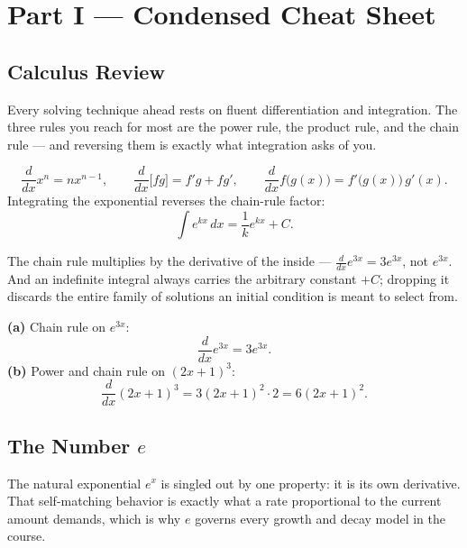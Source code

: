 \documentclass[11pt]{article}
\begin{document}
\section*{Part I --- Condensed Cheat Sheet}
\setcounter{section}{1}   %

\subsection{Calculus Review}

Every solving technique ahead rests on fluent differentiation and integration.
The three rules you reach for most are the power rule, the product rule, and the
chain rule --- and reversing them is exactly what integration asks of you.

\begin{formulabox}
\[
    \frac{d}{dx}x^{n} = nx^{n-1}, \qquad
    \frac{d}{dx}\big[f g\big] = f'g + fg', \qquad
    \frac{d}{dx}f\big(g(x)\big) = f'\big(g(x)\big)\,g'(x).
\]
Integrating the exponential reverses the chain-rule factor:
\[
    \int e^{kx}\,dx = \frac{1}{k}e^{kx} + C.
\]
\end{formulabox}

\begin{warningbox}
The chain rule multiplies by the derivative of the inside --- $\frac{d}{dx}e^{3x}
= 3e^{3x}$, not $e^{3x}$. And an indefinite integral always carries the
arbitrary constant $+C$; dropping it discards the entire family of solutions an
initial condition is meant to select from.
\end{warningbox}

\begin{examplebox}
\textbf{(a)} Chain rule on $e^{3x}$:
\[ \frac{d}{dx}e^{3x} = 3e^{3x}. \]
\textbf{(b)} Power and chain rule on $(2x+1)^{3}$:
\[ \frac{d}{dx}(2x+1)^{3} = 3(2x+1)^{2}\cdot 2 = 6(2x+1)^{2}. \]
\end{examplebox}

\subsection{The Number $e$}

The natural exponential $e^{x}$ is singled out by one property: it is its own
derivative. That self-matching behavior is exactly what a rate proportional to
the current amount demands, which is why $e$ governs every growth and decay
model in the course.
\end{document}
